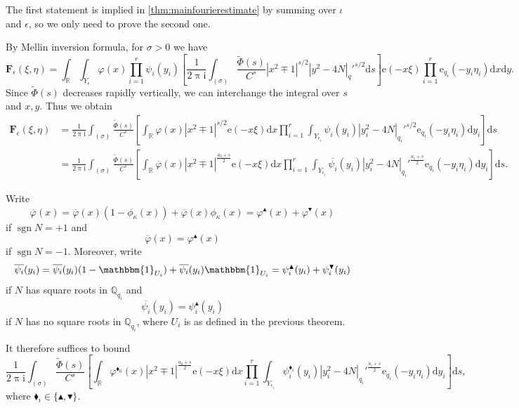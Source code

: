 \documentclass[10pt,oneside,reqno]{amsart}
\makeatletter
\newcommand\rmd{\mathrm{d}}
\newcommand\rme{\mathrm{e}}
\newcommand\rmi{\mathrm{i}}
\newcommand\bF{\mathbf{F}}
\newcommand\QQ{\mathbb{Q}}
\newcommand\RR{\mathbb{R}}
\newcommand\triv{\mathbbm{1}}
\newcommand\dpii{2\uppi\rmi}
\DeclareMathOperator\sgn{sgn}
\theoremstyle{THEOREM}
\theoremstyle{DEFINITION}
\theoremstyle{EXERCISE}
\numberwithin{equation}{section}
\renewenvironment{proof}[1][\proofname]{\par
  \vspace{-6pt}
  \pushQED{\qed}
  \normalfont \topsep6\p@\@plus6\p@\relax
  \trivlist
  \item[\hskip\labelsep\rmfamily\bfseries
    #1\@addpunct{:}]\ignorespaces
}{
  \popQED\endtrivlist\@endpefalse
  \vspace{-6pt}
}
\makeatother
\begin{document}
\begin{proof}[Proof of \autoref{thm:mainfourierestimate2}]
The first statement is implied in \autoref{thm:mainfourierestimate} by summing over $\iota$ and $\epsilon$, so we only need to prove the second one.

By Mellin inversion formula, for $\sigma>0$ we have
\[
\bF_\epsilon(\xi,\eta)=\int_{\RR}\int_{Y_\epsilon}\varphi(x)\prod_{i=1}^{r}\psi_i(y_i)\left[\frac{1}{\dpii}\int_{(\sigma)}\frac{\widetilde{\Phi}(s)}{C^s}|x^2\mp 1|^{s/2}|y^2-4N|_q'^{s/2}\rmd s\right]\rme(-x\xi)\prod_{i=1}^{r}\rme_{q_i}(-y_i\eta_i)\rmd x\rmd y.
\]
Since $\widetilde{\Phi}(s)$ decreases rapidly vertically, we can interchange the integral over $s$ and $x,y$. Thus we obtain
\begin{align*}
\bF_\epsilon(\xi,\eta)&=\frac{1}{\dpii}\int_{(\sigma)}\frac{\widetilde{\Phi}(s)}{C^s}\left[ \int_{\RR}\varphi(x)|x^2\mp 1|^{s/2}\rme(-x\xi)\rmd x\prod_{i=1}^{r}\int_{Y_{\epsilon_i}}\psi_i(y_i)|y_i^2-4N|_{q_i}'^{s/2}\rme_{q_i}(-y_i\eta_i)\rmd y_i\right]\rmd s\\
&=\frac{1}{\dpii}\int_{(\sigma)}\frac{\widetilde{\Phi}(s)}{C^s}\left[ \int_{\RR}\overline{\varphi}(x)|x^2\mp 1|^{\frac{a_0+s}{2}}\rme(-x\xi)\rmd x\prod_{i=1}^{r}\int_{Y_{\epsilon_i}}\overline{\psi_i}(y_i)|y_i^2-4N|_{q_i}'^{\frac{a_i+s}{2}}\rme_{q_i}(-y_i\eta_i)\rmd y_i\right]\rmd s.
\end{align*}

Write 
\[
\overline{\varphi}(x)=\overline{\varphi}(x)(1-\phi_\kappa(x))+\overline{\varphi}(x)\phi_\kappa(x) =\varphi^\blacktriangle(x)+\varphi^\blacktriangledown(x)
\]
if $\sgn N=+1$ and
\[
\overline{\varphi}(x)=\varphi^\blacktriangle(x)
\]
if $\sgn N=-1$. Moreover, write
\[
\overline{\psi_i}(y_i)=\overline{\psi_i}(y_i)(1-\triv_{U_i})+\overline{\psi_i}(y_i)\triv_{U_i} =\psi_i^\blacktriangle(y_i)+\psi_i^\blacktriangledown(y_i)
\]
if $N$ has square roots in $\QQ_{q_i}$ and
\[
\overline{\psi_i}(y_i)=\psi_i^\blacktriangle(y_i)
\]
if $N$ has no square roots in $\QQ_{q_i}$, where $U_i$ is as defined in the previous theorem.

It therefore suffices to bound
\begin{equation}\label{eq:keyestimate2}
\frac{1}{\dpii}\int_{(\sigma)}\frac{\widetilde{\Phi}(s)}{C^s}\left[ \int_{\RR}\varphi^{\blacklozenge_0}(x)|x^2\mp 1|^{\frac{a_0+s}{2}}\rme(-x\xi)\rmd x\prod_{i=1}^{r}\int_{Y_{\epsilon_i}}\psi_i^{\blacklozenge_i}(y_i)|y_i^2-4N|_{q_i}'^{\frac{a_i+s}{2}}\rme_{q_i}(-y_i\eta_i)\rmd y_i\right]\rmd s,
\end{equation}
where $\blacklozenge_i\in \{\blacktriangle,\blacktriangledown\}$.


\end{proof}
\end{document}
